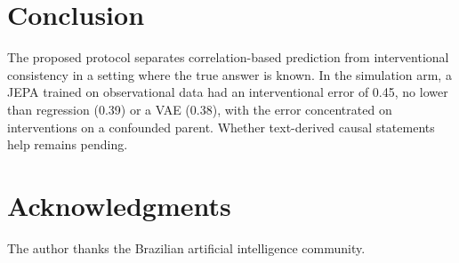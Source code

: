 \documentclass[conference]{IEEEtran}
\begin{document}
\section{Conclusion}
The proposed protocol separates correlation-based prediction from interventional consistency in a setting where the true answer is known. In the simulation arm, a JEPA trained on observational data had an interventional error of 0.45, no lower than regression (0.39) or a VAE (0.38), with the error concentrated on interventions on a confounded parent. Whether text-derived causal statements help remains pending.

\section*{Acknowledgments}
The author thanks the Brazilian artificial intelligence community.

\nocite{ctl_full_names}


\end{document}
